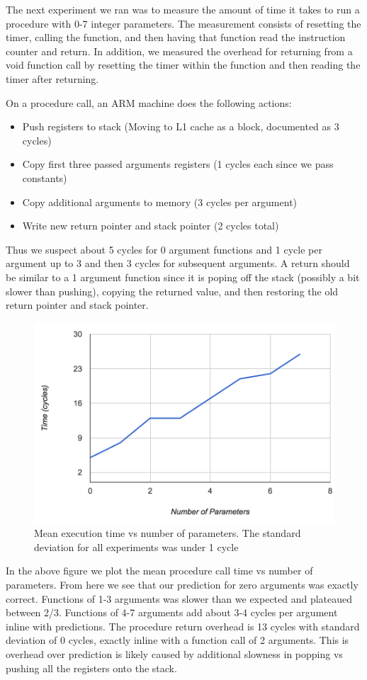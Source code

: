 The next experiment we ran was to measure the amount of time it takes to run a procedure with 0-7 integer parameters. 
The measurement consists of resetting the timer, calling the function, and then having that function  read the instruction counter and return.
In addition, we measured the overhead for returning from a void function call by resetting the timer within the function and then reading the timer after returning.

On a procedure call, an ARM machine does the following actions:
\begin{itemize}
	\item Push registers to stack (Moving to L1 cache as a block, documented as 3 cycles)
	\item Copy first three passed arguments registers (1 cycles each since we pass constants)
	\item Copy additional arguments to memory (3 cycles per argument)
	\item Write new return pointer and stack pointer (2 cycles total)
\end{itemize}
Thus we suspect about 5 cycles for 0 argument functions and 1 cycle per argument up to 3 and then 3 cycles for subsequent arguments.
A return should be similar to a 1 argument function since it is poping off the stack (possibly a bit slower than pushing), copying the returned value, and then restoring the old return pointer and stack pointer.

\begin{figure}[h]
\centering
\includegraphics[scale=.5]{experiments/exp_1_2_fig.png}
\caption{Mean execution time vs number of parameters.    The standard deviation for all experiments was under 1 cycle}
\end{figure}

In the above figure we plot the mean procedure call time vs number of parameters.
From here we see that our prediction for zero arguments was exactly correct.  
Functions of 1-3 arguments was slower than we expected and plateaued between 2/3.
Functions of 4-7 arguments add about 3-4 cycles per argument inline with predictions.
The procedure return overhead is 13 cycles with standard deviation of 0 cycles, exactly inline with a function call of 2 arguments.
This is overhead over prediction is likely caused by additional slowness in popping vs pushing all the registers onto the stack.